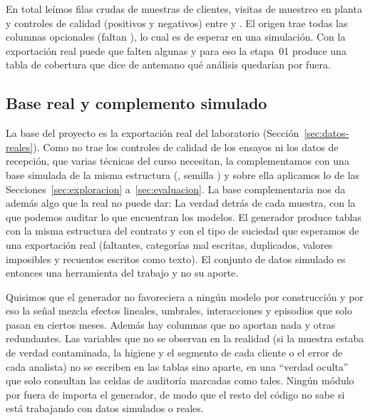 \begin{table}[!htbp]
\centering
\begin{minipage}[t]{0.40\textwidth}\centering\small
{}
\end{minipage}\hfill
\begin{minipage}[t]{0.40\textwidth}\centering\small
{}
\end{minipage}
\caption{Filas de cada tabla cruda (izquierda) y columnas del contrato que se
conocen en cada momento del proceso (derecha), en el orden en que ocurren: Un
modelo que predice en un momento solo ve las columnas de su fila y de las
anteriores.}
\label{tab:momentos}
\end{table}

En total leímos \DatMuestrasCrudas{} filas crudas de muestras de
\DatClientes{} clientes, \DatVisitas{} visitas de muestreo en planta y
\DatControles{} controles de calidad (positivos y negativos) entre
\DatDesde{} y \DatHasta{}. El origen trae todas las columnas opcionales
(faltan \DatFaltanOpcionales{}), lo cual es de esperar en una simulación. Con
la exportación real puede que falten algunas y para eso la etapa~01 produce
una tabla de cobertura que dice de antemano qué análisis quedarían por fuera.

\subsection{Base real y complemento simulado}
\label{sec:simulacion}

La base del proyecto es la exportación real del laboratorio
(Sección~\ref{sec:datos-reales}). Como no trae los controles de calidad de
los ensayos ni los datos de recepción, que varias técnicas del curso
necesitan, la complementamos con una base simulada de la misma estructura
(, semilla \DatSemilla{}) y sobre ella
aplicamos lo de las Secciones~\ref{sec:exploracion} a~\ref{sec:evaluacion}.
La base complementaria nos da además algo que la real no puede dar: La
verdad detrás de cada muestra, con la que podemos auditar lo que encuentran
los modelos. El generador produce
tablas con la misma estructura del contrato y con el tipo de suciedad que
esperamos de una exportación real (faltantes, categorías mal escritas,
duplicados, valores imposibles y recuentos escritos como texto). El conjunto
de datos simulado es entonces una herramienta del trabajo y no su aporte.

Quisimos que el generador no favoreciera a ningún modelo por construcción y
por eso la señal mezcla efectos lineales, umbrales,
interacciones y episodios que solo pasan en ciertos meses. Además hay
columnas que no aportan nada y otras redundantes. Las variables que no se
observan en la realidad (si la muestra estaba de verdad contaminada, la
higiene y el segmento de cada cliente o el error de cada analista) no se
escriben en las tablas sino aparte, en una ``verdad oculta'' que solo
consultan las celdas de auditoría marcadas como tales. Ningún módulo por
fuera de  importa el generador, de modo que el resto
del código no sabe si está trabajando con datos simulados o reales.

